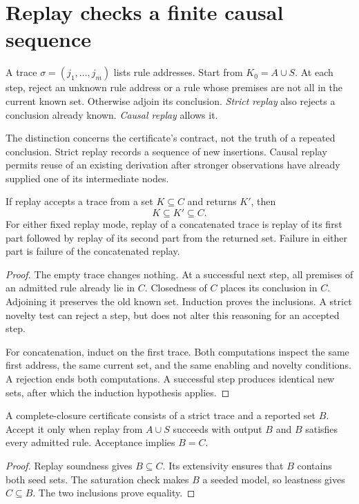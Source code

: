 \section{Replay checks a finite causal sequence}
A trace $\sigma=(j_1,\ldots,j_m)$ lists rule addresses. Start from $K_0=A\cup S$. At each step, reject an unknown rule address or a rule whose premises are not all in the current known set. Otherwise adjoin its conclusion. \emph{Strict replay} also rejects a conclusion already known. \emph{Causal replay} allows it.

The distinction concerns the certificate's contract, not the truth of a repeated conclusion. Strict replay records a sequence of new insertions. Causal replay permits reuse of an existing derivation after stronger observations have already supplied one of its intermediate nodes.

\begin{Coretheorem}\label{Core:r:field-replay}
If replay accepts a trace from a set $K\subseteq C$ and returns $K'$, then
\[
 K\subseteq K'\subseteq C.
\]
For either fixed replay mode, replay of a concatenated trace is replay of its first part followed by replay of its second part from the returned set. Failure in either part is failure of the concatenated replay.
\end{Coretheorem}
\begin{proof}
The empty trace changes nothing. At a successful next step, all premises of an admitted rule already lie in $C$. Closedness of $C$ places its conclusion in $C$. Adjoining it preserves the old known set. Induction proves the inclusions. A strict novelty test can reject a step, but does not alter this reasoning for an accepted step.

For concatenation, induct on the first trace. Both computations inspect the same first address, the same current set, and the same enabling and novelty conditions. A rejection ends both computations. A successful step produces identical new sets, after which the induction hypothesis applies.
\end{proof}

\begin{Coretheorem}\label{Core:r:field-exact}
A complete-closure certificate consists of a strict trace and a reported set $B$. Accept it only when replay from $A\cup S$ succeeds with output $B$ and $B$ satisfies every admitted rule. Acceptance implies $B=C$.
\end{Coretheorem}
\begin{proof}
Replay soundness gives $B\subseteq C$. Its extensivity ensures that $B$ contains both seed sets. The saturation check makes $B$ a seeded model, so leastness gives $C\subseteq B$. The two inclusions prove equality.
\end{proof}

